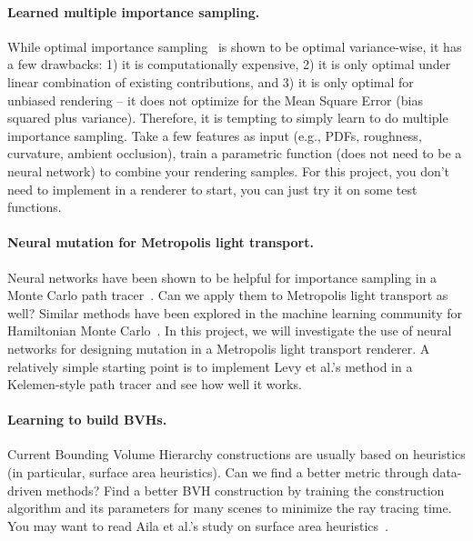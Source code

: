 \paragraph{Learned multiple importance sampling.}
While optimal importance sampling~\cite{Kondapaneni:2019:OMI} is shown to be optimal variance-wise, it has a few drawbacks: 1) it is computationally expensive, 2) it is only optimal under linear combination of existing contributions, and 3) it is only optimal for unbiased rendering -- it does not optimize for the Mean Square Error (bias squared plus variance). Therefore, it is tempting to simply learn to do multiple importance sampling. Take a few features as input (e.g., PDFs, roughness, curvature, ambient occlusion), train a parametric function (does not need to be a neural network) to combine your rendering samples. For this project, you don't need to implement in a renderer to start, you can just try it on some test functions.

\paragraph{Neural mutation for Metropolis light transport.}
Neural networks have been shown to be helpful for importance sampling in a Monte Carlo path tracer~\cite{Muller:2019:NIS}.
Can we apply them to Metropolis light transport as well?
Similar methods have been explored in the machine learning community for Hamiltonian Monte Carlo~\cite{Levy:2018:GHM}.
In this project, we will investigate the use of neural networks for designing mutation in a Metropolis light transport renderer.
A relatively simple starting point is to implement Levy et al.'s method in a Kelemen-style path tracer and see how well it works. 

\paragraph{Learning to build BVHs.}
Current Bounding Volume Hierarchy constructions are usually based on heuristics (in particular, surface area heuristics). Can we find a better metric through data-driven methods? Find a better BVH construction by training the construction algorithm and its parameters for many scenes to minimize the ray tracing time. You may want to read Aila et al.'s study on surface area heuristics~\cite{Aila:2013:QMB}.

